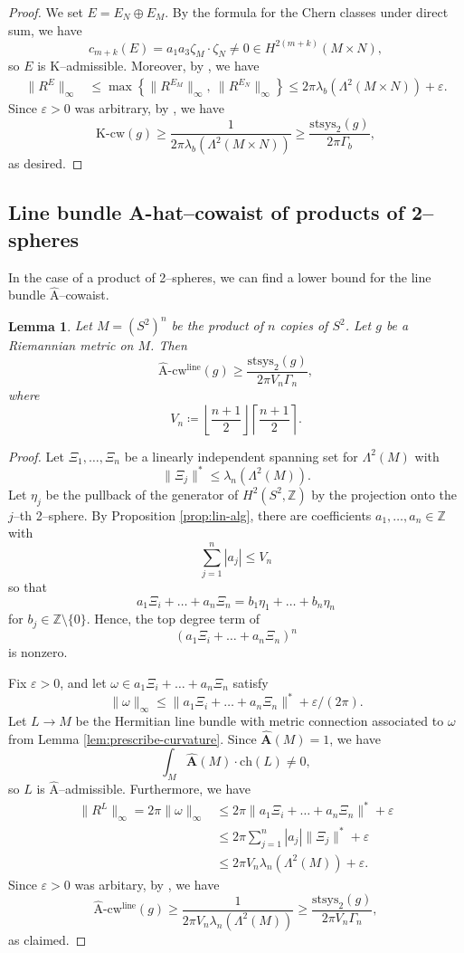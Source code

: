 \documentclass[12pt]{amsart}
\newtheorem{lemma}[theorem]{Lemma}
\theoremstyle{definition}
\numberwithin{equation}{section}
\newcommand{\Z}{\mathbb{Z}}
\newcommand{\eps}{\varepsilon}
\newcommand{\kcw}{\mathrm{K}\text{-}\mathrm{cw}}
\newcommand{\acw}{\hat{\mathrm{A}}\text{-}\mathrm{cw}}
\newcommand{\ahat}{\hat{\mathrm{A}}}
\begin{document}
\begin{proof}
We set $E = E_N \oplus E_M$. By the formula for the Chern classes under direct sum, we have
\[ c_{m+k}(E) = a_1a_3\zeta_M\cdot \zeta_N \neq 0 \in H^{2(m+k)}(M \times N), \]
so $E$ is $\mathrm{K}$--admissible. Moreover, by \cite[\S4, Page 18]{Gromov:K-area}, we have
\begin{align*}
\|R^E\|_{\infty}
& \leq \max\left\{\|R^{E_M}\|_{\infty},\ \|R^{E_N}\|_{\infty}\right\} \leq 2\pi\lambda_b(\Lambda^2(M \times N)) + \eps.
\end{align*}
Since $\eps > 0$ was arbitrary, by \cite[\S2]{GHK:systole}, we have
\[ \kcw(g) \geq \frac{1}{2\pi \lambda_b(\Lambda^2(M\times N))} \geq \frac{\mathrm{stsys}_2(g)}{2\pi \Gamma_b}, \]
as desired.
\end{proof}


\subsection{Line bundle A-hat--cowaist of products of 2--spheres}
In the case of a product of 2--spheres, we can find a lower bound for the line bundle $\ahat$--cowaist.

\begin{lemma}\label{lem:cw-s2}
Let $M = (S^2)^n$ be the product of $n$ copies of $S^2$. Let $g$ be a Riemannian metric on $M$. Then
\[ \acw^{\mathrm{line}}(g) \geq \frac{\mathrm{stsys}_2(g)}{2\pi V_n\Gamma_n}, \]
where
\[ V_n \coloneq \left\lfloor \frac{n+1}{2}\right\rfloor \left\lceil \frac{n+1}{2}\right\rceil. \]
\end{lemma}
\begin{proof}
Let $\Xi_1, \hdots, \Xi_n$ be a linearly independent spanning set for $\Lambda^2(M)$ with
\[ \|\Xi_j\|^* \leq \lambda_n(\Lambda^2(M)). \]
Let $\eta_j$ be the pullback of the generator of $H^2(S^2, \Z)$ by the projection onto the $j$--th 2--sphere. By Proposition \ref{prop:lin-alg}, there are coefficients $a_1, \hdots, a_n \in \Z$ with
\[ \sum_{j=1}^n |a_j| \leq V_n \]
so that
\[ a_1\Xi_i + \hdots + a_n\Xi_n = b_1\eta_1 + \hdots + b_n\eta_n \]
for $b_j \in \Z \setminus \{0\}$. Hence, the top degree term of
\[ (a_1\Xi_i + \hdots + a_n\Xi_n)^n \]
is nonzero.

Fix $\eps > 0$, and let $\omega \in a_1\Xi_i + \hdots + a_n\Xi_n$ satisfy
\[ \|\omega\|_{\infty} \leq \|a_1\Xi_i + \hdots + a_n\Xi_n\|^* + \eps/(2\pi). \]
Let $L \to M$ be the Hermitian line bundle with metric connection associated to $\omega$ from Lemma \ref{lem:prescribe-curvature}. Since $\hat{\mathbf{A}}(M) = 1$, we have
\[ \int_M \hat{\mathbf{A}}(M) \cdot \mathrm{ch}(L) \neq 0, \]
so $L$ is $\ahat$--admissible. Furthermore, we have
\begin{align*}
\|R^L\|_{\infty} = 2\pi\|\omega\|_{\infty}
& \leq 2\pi\|a_1\Xi_i + \hdots + a_n\Xi_n\|^* + \eps\\
& \leq 2\pi\sum_{j=1}^n |a_j|\|\Xi_j\|^* + \eps\\
& \leq 2\pi V_n\lambda_n(\Lambda^2(M)) + \eps.
\end{align*}
Since $\eps > 0$ was arbitary, by \cite[\S2]{GHK:systole}, we have
\[ \acw^{\mathrm{line}}(g) \geq \frac{1}{2\pi V_n \lambda_n(\Lambda^2(M))} \geq \frac{\mathrm{stsys}_2(g)}{2\pi V_n\Gamma_n}, \]
as claimed.
\end{proof}
\end{document}
